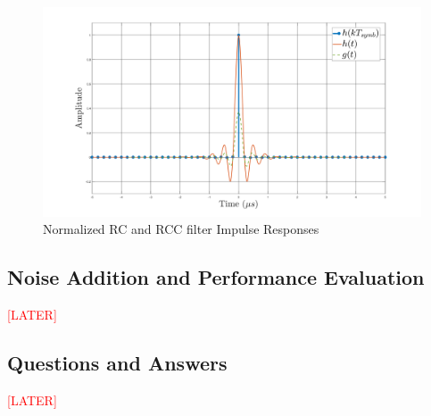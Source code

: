 \begin{figure}[H]
	\centering
	\includegraphics[width=0.9\linewidth]{Images/h-rc}
	\caption{Normalized RC and RCC filter Impulse Responses}
	\label{fig:h-rc}
\end{figure}


\subsection{Noise Addition and Performance Evaluation}
\textcolor{red}{[LATER]}
\subsection{Questions and Answers}
\textcolor{red}{[LATER]}